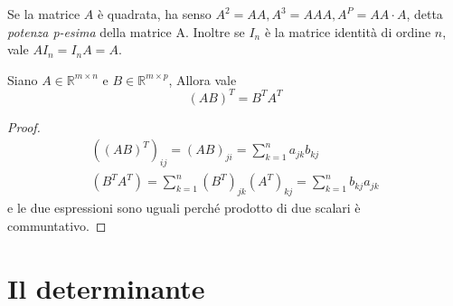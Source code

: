 \begin{oss}
  \label{oss:prodmtxrigcol3}
  Se la matrice $A$ è quadrata, ha senso $A^2=AA, A^3=AAA, A^P=AA\cdot{}A$, detta
  \textit{potenza p-esima} della matrice A. Inoltre se $I_n$ è la matrice identità di
  ordine $n$, vale $AI_n=I_nA=A$.
\end{oss}
\begin{prop}
  \label{prop:prodmtxrigcol1}
  Siano $A\in\mathds{R}^{m\times n}$ e $B\in \mathds{R}^{m\times p}$, Allora vale
  \begin{equation*}
    (AB)^T=B^TA^T
  \end{equation*}
  \begin{proof}
    \begin{eqnarray*}
      ((AB)^T)_{ij}=(AB)_{ji}=\sum_{k=1}^na_{jk}b_{kj}\\
      (B^TA^T)=\sum_{k=1}^n(B^T)_{jk} (A^T)_{kj}=\sum_{k=1}^nb_{kj}a_{jk}
    \end{eqnarray*}
    e le due espressioni sono uguali perché prodotto di due scalari è communtativo.
  \end{proof}
\end{prop}

\section{Il determinante}
\label{sec:determinante}

